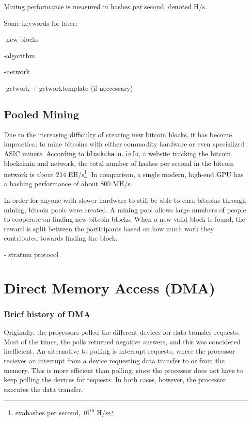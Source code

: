 Mining performance is measured in hashes per second, denoted H/s.

Some keywords for later:

-new blocks

-algorithm

-network

-getwork + getworktemplate (if neccessary)

\subsection{Pooled Mining}
Due to the increasing difficulty of creating new bitcoin blocks, it has become impractical
to mine bitcoins with either commodity hardware or even specialized ASIC miners. According
to \texttt{blockchain.info}, a website tracking the bitcoin blockchain and network, the
total number of hashes per second in the bitcoin network is about 214 EH/s\footnote{exahashes per second, $10^18$ H/s}.
In comparison, a single modern, high-end GPU has a hashing performance of about 800 MH/s.

In order for anyone with slower hardware to still be able to earn bitcoins through mining,
bitcoin pools were created. A mining pool allows large numbers of people to cooperate on
finding new bitcoin blocks. When a new valid block is found, the reward is split between
the participants based on how much work they contributed towards finding the block.

- stratum protocol

\section{Direct Memory Access (DMA)}

\subsubsection{Brief history of DMA}

Originally, the processors polled the different devices for data transfer requests. Most of the times, the polls returned negative answers, and this was concidered inefficient. An alternative to polling is interrupt requests, where the processor recieves an interrupt from a device requesting data transfer to or from the memory. This is more efficient than polling, since the processor does not have to keep polling the devices for requests. In both cases, however, the processor executes the data transfer.

